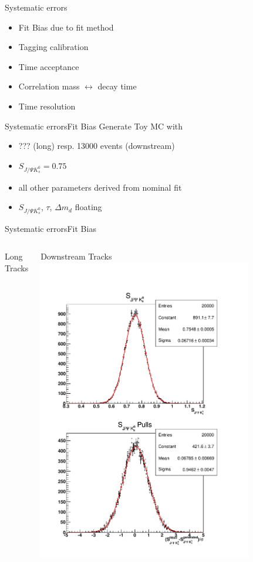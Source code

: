 \documentclass{beamer}
\newcommand{\SJPsi}{S_{J/\Psi K_s^0}}
\begin{document}
	
	\begin{frame}{Systematic errors}
	\begin{itemize}
		\item Fit Bias due to fit method
	    \item Tagging calibration
	    \item Time acceptance
	    \item Correlation mass $\leftrightarrow$ decay time
	    \item Time resolution
	\end{itemize}
	\end{frame}
	
	\begin{frame}{Systematic errors}{Fit Bias}
	Generate Toy MC with 
	\begin{itemize}
	\item ??? (long) resp. 13000 events (downstream)
	\item $\SJPsi = 0.75$
	\item all other parameters derived from nominal fit
	\item $\SJPsi$, $\tau$, $\Delta m_d$ floating
	\end{itemize}
    \end{frame}	
	
	\begin{frame}{Systematic errors}{Fit Bias}
	\begin{columns}
	\begin{block}{Long Tracks}
	\centering
	\end{block}
	\begin{block}{Downstream Tracks}
	\centering
	\includegraphics[width=0.8\textwidth]{fit_bias_ds}
	\end{block}
	\end{columns}
	\end{frame}
	
\end{document}
